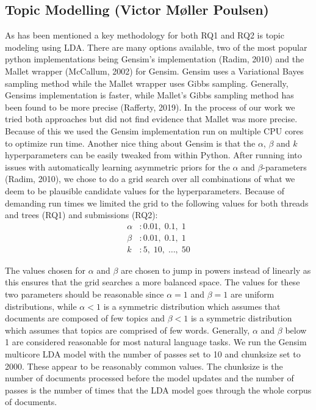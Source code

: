 \documentclass{article}
\begin{document}
    \subsection{Topic Modelling (Victor Møller Poulsen)}
    As has been mentioned a key methodology for both RQ1 and RQ2 is topic modeling using LDA. There are many options available, two of the most popular python implementations being Gensim’s implementation (Radim, 2010) and the Mallet wrapper (McCallum, 2002) for Gensim. Gensim uses a Variational Bayes sampling method while the Mallet wrapper uses Gibbs sampling. Generally, Gensims implementation is faster, while Mallet’s Gibbs sampling method has been found to be more precise (Rafferty, 2019). In the process of our work we tried both approaches but did not find evidence that Mallet was more precise. Because of this we used the Gensim implementation run on multiple CPU cores to optimize run time. 
Another nice thing about Gensim is that the $\alpha$, $\beta$ and $k$ hyperparameters can be easily tweaked from within Python. After running into issues with automatically learning asymmetric priors for the $\alpha$ and $\beta$-parameters (Radim, 2010), we chose to do a grid search over all combinations of what we deem to be plausible candidate values for the hyperparameters. Because of demanding run times we limited the grid to the following values for both threads and trees (RQ1) and submissions (RQ2): 
\begin{align*} 
    \alpha&: 0.01,\; 0.1,\; 1\\
    \beta&: 0.01, \; 0.1, \; 1 \\
    k&: 5, \; 10, \; \ldots,\; 50     
\end{align*}

The values chosen for $\alpha$ and $\beta$ are chosen to jump in powers instead of linearly as this ensures that the grid searches a more balanced space. The values for these two parameters should be reasonable since $\alpha = 1$ and $\beta = 1$ are uniform distributions, while $\alpha < 1$ is a symmetric distribution which assumes that documents are composed of few topics and $\beta < 1$ is a symmetric distribution which assumes that topics are comprised of few words. Generally, $\alpha$ and $\beta$ below 1 are considered reasonable for most natural language tasks. 
We run the Gensim multicore LDA model with the number of passes set to 10 and chunksize set to 2000. These appear to be reasonably common values. The chunksize is the number of documents processed before the model updates and the number of passes is the number of times that the LDA model goes through the whole corpus of documents.
\end{document}
